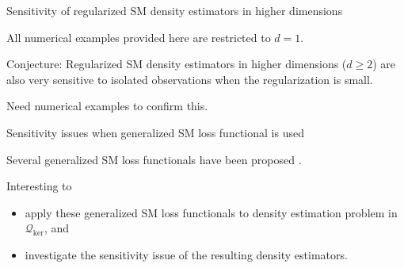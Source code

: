 \documentclass[aspectratio=169,xcolor=dvipsnames]{beamer}
\begin{document}
\begin{frame}{Sensitivity of regularized SM density estimators in higher dimensions}
	
	All numerical examples provided here are restricted to $d = 1$. 
	
	\vspace{10pt}
	
	{\color{defaultcolor} Conjecture:} Regularized SM density estimators in higher dimensions ($d \ge 2$) are also very sensitive to isolated observations when the regularization is small. 
	
	\vspace{10pt}
		
	Need numerical examples to confirm this. 

\end{frame}


%	
%	
%	
%	
%	


\begin{frame}{Sensitivity issues when generalized SM loss functional is used}
	
	Several generalized SM loss functionals have been proposed \parencite{Parry2012-pa, Yu2020-fb}. 
	
	\vspace{10pt}
	
	Interesting to 
	\begin{itemize}
		\item apply these generalized SM loss functionals to density estimation problem in $\mathcal{Q}_{\ker}$, and 
		\item investigate the sensitivity issue of the resulting density estimators. 
	\end{itemize}
	
\end{frame}
\end{document}
